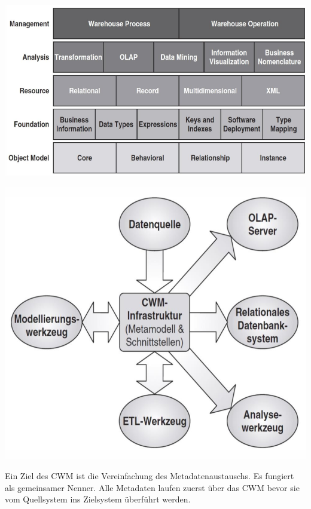 \documentclass[a4paper, 11pt, nofootinbib]{article}
\begin{document}
\begin{minipage}{0.5\textwidth}
		\centering
		\includegraphics[keepaspectratio=true,height=10\baselineskip]{CWM_schichten.PNG}
		\label{fig:cwm_schichten}
\end{minipage}
\begin{minipage}{0.5\textwidth}
		\includegraphics[keepaspectratio=true,height=10\baselineskip]{CWM_metamodell.PNG}
		\label{fig:cwm_meta}
\end{minipage}

\vspace{10px}

\noindent Ein Ziel des CWM ist die Vereinfachung des Metadatenaustauschs. Es fungiert als gemeinsamer Nenner. Alle Metadaten laufen zuerst über das CWM bevor sie vom Quellsystem ins Zielsystem überführt werden.
\end{document}
